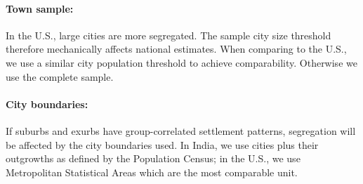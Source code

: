 \documentclass[12pt]{article}
\begin{document}
 \paragraph{Town sample:} In the U.S., large cities are more segregated. The sample city size threshold therefore mechanically affects national estimates. When comparing to the U.S., we use a similar city population threshold to achieve comparability. Otherwise we use the complete sample.

 \paragraph{City boundaries:} If suburbs and exurbs have group-correlated settlement patterns, segregation will be affected by the city boundaries used. In India, we use cities plus their outgrowths as defined by the Population Census; in the U.S., we use Metropolitan Statistical Areas which are the most comparable unit.
\end{document}
